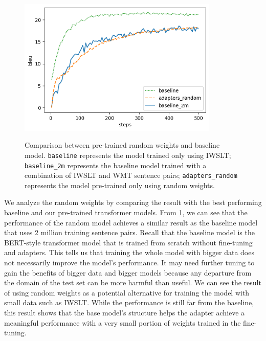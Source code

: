 \begin{figure}[h]
    {\includegraphics[width=0.85\textwidth]{img/random.png}}
    \centering
    \caption[Comparison between pre-trained random weights and baseline model.]{Comparison between pre-trained random weights and baseline model. \texttt{baseline} represents the model trained only using IWSLT; \texttt{baseline\_2m} represents the baseline model trained with a combination of IWSLT and WMT sentence pairs; \texttt{adapters\_random} represents the model pre-trained only using random weights.}
    \label{img:rndbslcmp}
\end{figure}

We analyze the random weights by comparing the result with the best performing baseline and our pre-trained transformer models. From \cref{img:rndbslcmp}, we can see that the performance of the random model achieves a similar result as the baseline model that uses 2 million training sentence pairs. Recall that the baseline model is the BERT-style transformer model that is trained from scratch without fine-tuning and adapters. This tells us that training the whole model with bigger data does not necessarily improve the model's performance. It may need further tuning to gain the benefits of bigger data and bigger models because any departure from the domain of the test set can be more harmful than useful. We can see the result of using random weights as a potential alternative for training the model with small data such as IWSLT. While the performance is still far from the baseline, this result shows that the base model's structure helps the adapter achieve a meaningful performance with a very small portion of weights trained in the fine-tuning.

